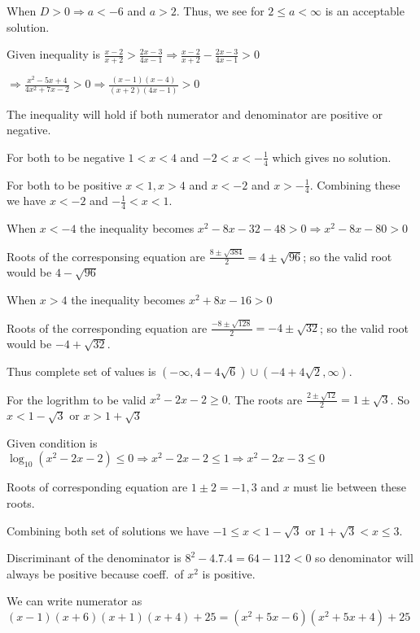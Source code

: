   When $D > 0 \Rightarrow a < -6$ and $a > 2$. Thus, we see for $2\leq a< \infty$ is an acceptable solution.
\item Given inequality is $\frac{x - 2}{x + 2} > \frac{2x - 3}{4x - 1}\Rightarrow \frac{x - 2}{x + 2}
  - \frac{2x - 3}{4x - 1} > 0$

  $\Rightarrow \frac{x^2 - 5x + 4}{4x^2 + 7x - 2}>0 \Rightarrow \frac{(x - 1)(x - 4)}{(x + 2)(4x - 1)} > 0$

  The inequality will hold if both numerator and denominator are positive or negative.

  For both to be negative $1 < x < 4$ and $-2 < x < -\frac{1}{4}$ which gives no solution.

  For both to be positive $x < 1, x > 4$ and $x < -2$ and $x > -\frac{1}{4}$. Combining these  we have $x <
  -2$ and $-\frac{1}{4} < x < 1$.
\item When $x < -4$ the inequality becomes $x^2 - 8x - 32 - 48 > 0 \Rightarrow x^2 - 8x - 80 > 0$

  Roots of the corresponsing equation are $\frac{8\pm \sqrt{384}}{2} = 4\pm\sqrt{96}$; so the valid root
  would be $4 - \sqrt{96}$

  When $x > 4$ the inequality becomes $x^2 + 8x - 16 > 0$

  Roots of the corresponding equation are $\frac{-8\pm\sqrt{128}}{2}= -4\pm\sqrt{32}$; so the valid root
  would be $-4 + \sqrt{32}$.

  Thus complete set of values is $(-\infty, 4 - 4\sqrt{6})\cup (-4 + 4\sqrt{2}, \infty)$.
\item For the logrithm to be valid $x^2 - 2x - 2 \geq 0$. The roots are $\frac{2\pm\sqrt{12}}{2} =
  1\pm\sqrt{3}$. So $x < 1 - \sqrt{3}$ or $x > 1 + \sqrt{3}$

  Given condition is $\log_{10}(x^2 - 2x - 2) \leq 0 \Rightarrow x^2 - 2x - 2\leq 1\Rightarrow x^2 - 2x -
  3\leq 0$

  Roots of corresponding equation are $1\pm2 = -1, 3$ and $x$ must lie between these roots.

  Combining both set of solutions we have $-1\leq x< 1 - \sqrt{3}$ or $1 + \sqrt{3}< x\leq 3$.
\item Discriminant of the denominator is $8^2 - 4.7.4 = 64 - 112 < 0$ so denominator will always be
  positive because coeff.\ of $x^2$ is positive.

  We can write numerator as $(x - 1)(x + 6)(x + 1)(x + 4) + 25 = \left(x^2 + 5x - 6\right)\left(x^2 + 5x +
  4\right)+ 25$

